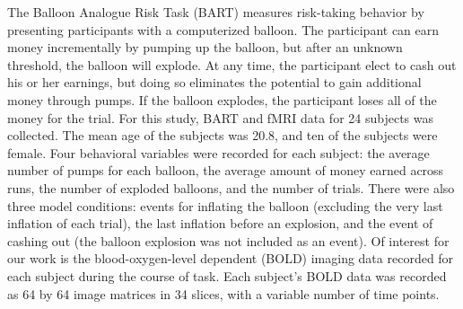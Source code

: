 \par \indent The Balloon Analogue Risk Task (BART) measures risk-taking 
behavior by presenting participants with a computerized balloon. The 
participant can earn money incrementally by pumping up the balloon, but after 
an unknown threshold, the balloon will explode. At any time, the participant 
elect to cash out his or her earnings, but doing so eliminates the potential to 
gain additional money through pumps. If the balloon explodes, the participant 
loses all of the money for the trial. For this study, BART and fMRI data for 24 
subjects was collected. The mean age of the subjects was 20.8, and ten of the 
subjects were female. Four behavioral variables were recorded for each subject: 
the average number of pumps for each balloon, the average amount of money 
earned across runs, the number of exploded balloons, and the number of trials. 
There were also three model conditions: events for inflating the balloon 
(excluding the very last inflation of each trial), the last inflation before an 
explosion, and the event of cashing out (the balloon explosion was not included 
as an event). Of interest for our work is the blood-oxygen-level dependent 
(BOLD) imaging data recorded for each subject during the course of task. Each 
subject's BOLD data was recorded as 64 by 64 image matrices in 34 slices, with 
a variable number of time points. 
